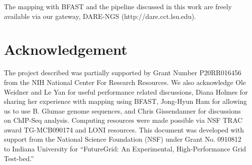 \documentclass{cpeauth}
\begin{document}
The mapping with BFAST and the pipeline discussed in this work are freely available via our gateway, DARE-NGS (http://dare.cct.lsu.edu).


\section*{Acknowledgement}

The project described was partially supported by Grant Number
P20RR016456 from the NIH National Center For Research Resources.  We
also acknowledge Ole Weidner and Le Yan for useful performance related
discussions, Diana Holmes for sharing her experience with mapping
using BFAST, Jong-Hyun Ham for allowing us to use B. Glumae genome
sequences, and Chris Gissendanner for discussions on ChIP-Seq analysis.   Computing
resources were made possible via NSF TRAC award TG-MCB090174 and LONI
resources.  This document was developed with support from the National
Science Foundation (NSF) under Grant No.  0910812 to Indiana
University for ``FutureGrid: An Experimental, High-Performance Grid
Test-bed.''

% 
 

\end{document}
